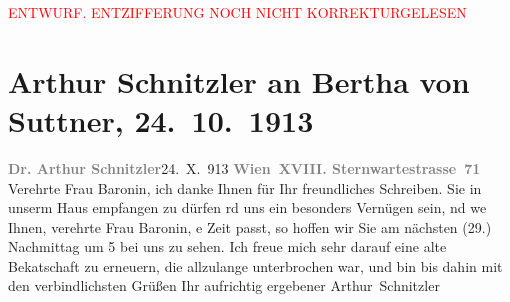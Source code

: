 
\begin{center}
            \textcolor{red}{ENTWURF. ENTZIFFERUNG NOCH NICHT KORREKTURGELESEN}
                      \end{center}
            
               \section[Arthur Schnitzler an Bertha von Suttner, 24. 10. 1913]{ Arthur Schnitzler an Bertha von Suttner,
                    24. 10. 1913}\nopagebreak{}\rehead{ }\begin{ledgroupsized}[t]{13cm}\normalsize\beginnumbering{} \toendnotes[C]{\smallbreak\pagebreak[2]} 
\toendnotes[C]{\smallbreak}\pstart
           \noindent{}{\pb}\textcolor{gray}{\textbf{Dr. Arthur Schnitzler}}\hfill 24. X. 913\pend
           \pstart
           \textcolor{gray}{\textbf{Wien XVIII. Sternwartestrasse 71}}\pend
           \pstart{}Verehrte Frau Baronin,\pend\pstart
           ich danke Ihnen für Ihr freundliches Schreiben. Sie in unserm Haus empfangen zu
                    dürfen rd uns ein besonders Vernügen sein, nd we{\geminationn} Ihnen, verehrte Frau Baronin,
                        e Zeit passt, so hoffen wir Sie {\pb}am \introOben{}nächsten\introOben{}{ }\label{K_L02154_1v}\label{K_L02154_1h}{ }\introOben{}(29.)\introOben{} Nachmittag um 5 bei uns
                    zu sehen.\pend
           \pstart
           Ich freue mich sehr darauf eine alte Beka{\geminationn}tschaft zu
                    erneuern, die allzulange unterbrochen war, und bin bis dahin mit den
                    verbindlichsten Grüßen Ihr aufrichtig ergebener\pend
           \pstart \spacefill\mbox{Arthur Schnitzler}\pend{}\endnumbering{}\end{ledgroupsized}  \newcommand{\dateiname}{L02154}\newcommand{\titel}{Arthur Schnitzler an Bertha von Suttner, 24. 10. 1913}\newcommand{\editorInnen}{Martin Anton Müller und Gerd-Hermann Susen}
      